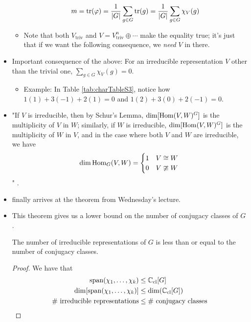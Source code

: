 \documentclass[../notes.tex]{subfiles}
\begin{document}
\begin{itemize}
\begin{itemize}
        \begin{equation*}
            m = \tr(\varphi)
            = \frac{1}{|G|}\sum_{g\in G}\tr(g)
            = \frac{1}{|G|}\sum_{g\in G}\chi_V(g)
        \end{equation*}
        \item Note that both $V_\text{triv}$ and $V=V_\text{triv}^n\oplus\cdots$ make the equality true; it's just that if we want the following consequence, we \emph{need} $V$ in there.
    \end{itemize}
    \item Important consequence of the above: For an irreducible representation $V$ other than the trivial one, $\sum_{g\in G}\chi_V(g)=0$.
    \begin{itemize}
        \item Example: In Table \ref{tab:charTableS3}, notice how $1(1)+3(-1)+2(1)=0$ and $1(2)+3(0)+2(-1)=0$.
    \end{itemize}
    \item "If $V$ is irreducible, then by Schur's Lemma, $\dim[\operatorname{Hom}(V,W)^G]$ is the multiplicity of $V$ in $W$; similarly, if $W$ is irreducible, $\dim[\operatorname{Hom}(V,W)^G]$ is the multiplicity of $W$ in $V$, and in the case where both $V$ and $W$ are irreducible, we have
    \begin{equation*}
        \dim\operatorname{Hom}_G(V,W) =
        \begin{cases}
            1 & V\cong W\\
            0 & V\ncong W
        \end{cases}
    \end{equation*}
    " \textcite[16]{bib:FultonHarris}.
    \item \textcite{bib:FultonHarris} finally arrives at the theorem from Wednesday's lecture.
    \setcounter{FHlemma}{12}
    \item This theorem gives us a lower bound on the number of conjugacy classes of $G$.
    \begin{FHcorollary}\label{cly:lowerBoundConjCl}
        The number of irreducible representations of $G$ is less than or equal to the number of conjugacy classes.
        \begin{proof}
            We have that
            \begin{align*}
                \spn(\chi_1,\dots,\chi_k) &\leq \C_\text{cl}[G]\\
                \dim[\spn(\chi_1,\dots,\chi_k)] &\leq \dim(\C_\text{cl}[G])\\
                \text{\# irreducible representations} &\leq \text{\# conjugacy classes}

\end{align*}
\end{proof}
\end{FHcorollary}
\end{itemize}
\end{document}
